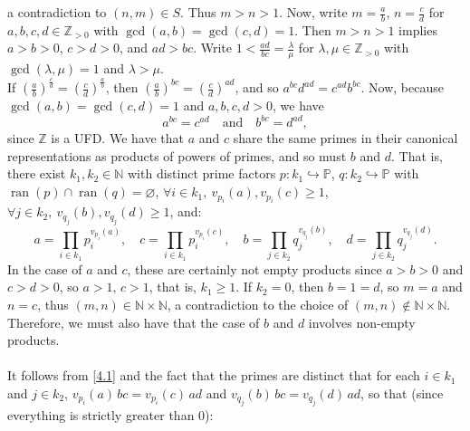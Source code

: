 \begin{solution}
\[    \]
    a contradiction to \( \left(n, m\right) \in S \). Thus \( m > n > 1 \). Now, write \( m = \frac{a}{b} \), \( n = \frac{c}{d} \) for \( a, b, c, d \in \mathbb{Z}_{>0} \) with \( \gcd\left(a, b\right) = \gcd\left(c, d\right) = 1 \). Then \( m > n > 1 \) implies \( a > b > 0 \), \( c > d > 0 \), and \( ad > bc \). Write \( 1 < \frac{ad}{bc} = \frac{\lambda}{\mu} \) for \( \lambda, \mu \in \mathbb{Z}_{>0} \) with \( \gcd\left(\lambda, \mu\right) = 1 \) and \( \lambda > \mu \). \\
    If \( \left( \frac{a}{b} \right)^{\frac{c}{d}} = \left( \frac{c}{d} \right)^{\frac{a}{b}} \), then \( \left( \frac{a}{b} \right)^{bc} = \left( \frac{c}{d} \right)^{ad} \), and so \( a^{bc} d^{ad} = c^{ad} b^{bc} \). Now, because \( \gcd\left(a, b\right) = \gcd\left(c, d\right) = 1 \) and \( a, b, c, d > 0 \), we have
    \begin{equation} \label{4.1}
        a^{bc} = c^{ad} \quad \text{and} \quad b^{bc} = d^{ad},
    \end{equation}
    since \( \mathbb{Z} \) is a UFD. We have that \( a \) and \( c \) share the same primes in their canonical representations as products of powers of primes, and so must \( b \) and \( d \). That is, there exist \( k_1, k_2 \in \mathbb{N} \) with distinct prime factors \( p \colon k_1 \hookrightarrow \mathbb{P} \), \( q \colon k_2 \hookrightarrow \mathbb{P} \) with \( \operatorname{ran}\left(p\right) \cap \operatorname{ran}\left(q\right) = \varnothing \), \( \forall i \in k_1,\ v_{p_i}\left(a\right), v_{p_i}\left(c\right) \geq 1 \), \( \forall j \in k_2,\ v_{q_j}\left(b\right), v_{q_j}\left(d\right) \geq 1 \), and:
    \[
        a = \prod_{i \in k_1} p_i^{v_{p_i}\left(a\right)},\quad c = \prod_{i \in k_1} p_i^{v_{p_i}\left(c\right)},\quad b = \prod_{j \in k_2} q_j^{v_{q_j}\left(b\right)},\quad d = \prod_{j \in k_2} q_j^{v_{q_j}\left(d\right)}.
    \]
    In the case of \( a \) and \( c \), these are certainly not empty products since \( a > b > 0 \) and \( c > d > 0 \), so \( a > 1,\, c > 1 \), that is, \( k_1 \geq 1 \). If \( k_2 = 0 \), then \( b = 1 = d \), so \( m = a \) and \( n = c \), thus \( \left(m, n\right) \in \mathbb{N} \times \mathbb{N} \), a contradiction to the choice of \( \left(m, n\right) \notin \mathbb{N} \times \mathbb{N} \). Therefore, we must also have that the case of \( b \) and \( d \) involves non-empty products.
    \\\\
    It follows from \eqref{4.1} and the fact that the primes are distinct that for each \( i \in k_1 \) and \( j \in k_2 \), \( v_{p_i}\left(a\right)\, bc = v_{p_i}\left(c\right)\, ad \) and \( v_{q_j}\left(b\right)\, bc = v_{q_j}\left(d\right)\, ad \), so that (since everything is strictly greater than \( 0 \)):

\end{solution}
